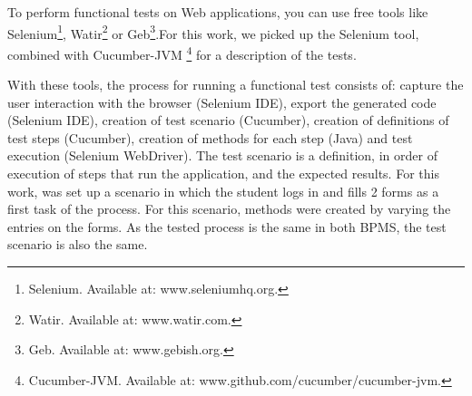 \documentclass[runningheads,a4paper]{llncs}
\begin{document}
{To perform functional tests on Web applications, you can use free tools like Selenium\footnote{Selenium. Available at: www.seleniumhq.org.}, Watir\footnote{Watir. Available at: www.watir.com.} or Geb\footnote{Geb. Available at: www.gebish.org.}.For this work, we picked up the Selenium tool, combined with Cucumber-JVM \footnote{Cucumber-JVM. Available at: www.github.com/cucumber/cucumber-jvm.} for a description of the tests. %


With these tools, the process for running a functional test consists of: capture the user interaction with the browser (Selenium IDE), export the generated code (Selenium IDE), creation of test scenario (Cucumber), creation of definitions of test steps (Cucumber), creation of methods for each step (Java) and test execution (Selenium WebDriver). The test scenario is a definition, in order of execution of steps that run the application, and the expected results. For this work, was set up a scenario in which the student logs in and fills 2 forms as a first task of the process. For this scenario, methods were created by varying the entries on the forms. As the tested process is the same in both BPMS, the test scenario is also the same.


}
\end{document}
